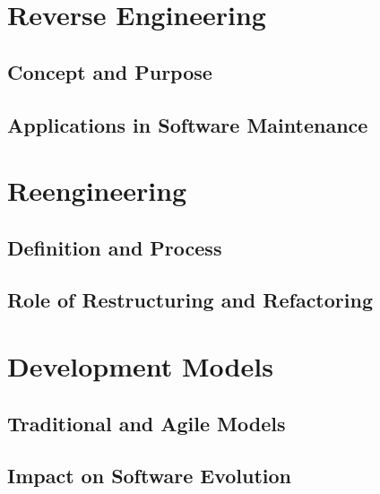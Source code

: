\section{Reverse Engineering}
\cite{ReverseEngineering2011} \cite{ReverseEngineering2005} \cite{ReverseEngineering1990}




\subsection{Concept and Purpose}



\subsection{Applications in Software Maintenance}











\section{Reengineering}
\cite{SoftwareEvolutionMens2008}


    
\subsection{Definition and Process}


\subsection{Role of Restructuring and Refactoring}





\section{Development Models}
\cite{DevelopmentModels2010}

\subsection{Traditional and Agile Models}

\subsection{Impact on Software Evolution}
